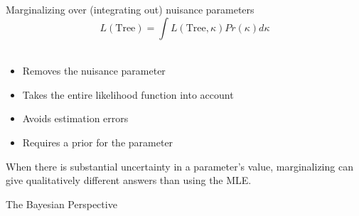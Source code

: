 \documentclass{seminar}
\begin{document}
\begin{slide}
\newslide 
Marginalizing over (integrating out) nuisance parameters\\[10pt]
\[L(\mbox{Tree}) = \int L(\mbox{Tree}, \kappa) Pr(\kappa) d\kappa  \]\\[10pt]
\begin{itemize}
	\item Removes the nuisance parameter
	\item Takes the entire likelihood function into account
	\item Avoids estimation errors
	\item Requires a prior for the parameter
\end{itemize}
\newslide 
\large When there is substantial uncertainty in a parameter's value, marginalizing can give qualitatively different answers than using the MLE.\\
\newslide 


\newslide 
{}
\newslide 
{}
\newslide 
{}
\newslide 
\Large The Bayesian Perspective \large \\


\end{slide}
\end{document}
